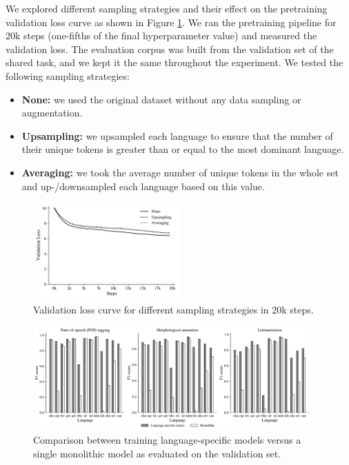 \documentclass[11pt]{article}
\begin{document}
We explored different sampling strategies and their effect on the pretraining validation loss curve as shown in Figure \ref{fig:effect_sampling}.
We ran the pretraining pipeline for 20k steps (one-fifths of the final hyperparameter value) and measured the validation loss.
The evaluation corpus was built from the validation set of the shared task, and we kept it the same throughout the experiment.
We tested the following sampling strategies:

\begin{itemize}
  \item \textbf{None:} we used the original dataset without any data sampling or augmentation.
  \item \textbf{Upsampling:} we upsampled each language to ensure that the number of their unique tokens is greater than or equal to the most dominant language.
  \item \textbf{Averaging:} we took the average number of unique tokens in the whole set and up-/downsampled each language based on this value.
\end{itemize}

\begin{figure}[t]
  \centering
  \includegraphics[width=0.5\textwidth]{figures/effect_sampling.pdf}
  \caption{Validation loss curve for different sampling strategies in 20k steps.}
  \label{fig:effect_sampling}
\end{figure}


\begin{figure}[t]
  \centering
  \includegraphics[width=0.95\textwidth]{figures/monolithic.pdf}
  \caption{Comparison between training language-specific models versus a single monolithic model as evaluated on the validation set.}
  \label{fig:monolithic}
\end{figure}
\end{document}
